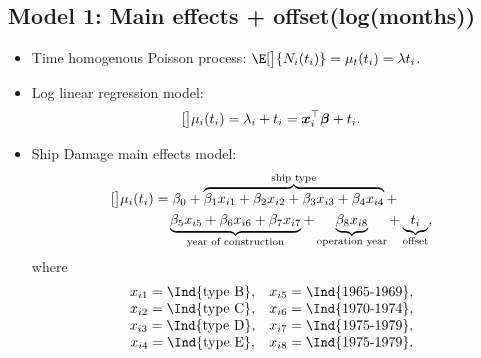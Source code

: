 \documentclass{article}\usepackage[]{graphicx}\usepackage[svgnames]{xcolor}
\let\log\relax%
\providecommand{\Vector}[1]{\bm{#1}}%
\begin{document}
\subsection*{Model 1: Main effects + offset(log(months))}
\begin{itemize}
    \item Time homogenous Poisson process: $ \E[\big]{N_i(t_i)}=\mu_t(t_i)=\lambda t_i $.
    \item Log linear regression model:
          \[ \log[\big]{\mu_i(t_i)}=\log{\lambda_i}+\log{t_i}=\Vector{x}_i^\top \Vector{\beta}+\log{t_i}. \]
    \item Ship Damage main effects model:
          \begin{align*}
              \log[\big]{\mu_i(t_i)}
               & =\beta_0+\overbrace{\beta_1x_{i1}+\beta_2x_{i2}+\beta_3x_{i3}+\beta_4x_{i4}}^{\text{ship type}}+ \\
               & \quad \underbrace{\beta_5x_{i5}+\beta_6x_{i6}+\beta_7x_{i7}}_{\text{year of construction}}+
              \underbrace{\beta_8x_{i8}}_{\text{operation year}}+\underbrace{\log{t_i}}_{\text{offset}},
          \end{align*}
          where
          \[ \begin{array}{cc}
                  x_{i1}=\Ind{\text{type B}}, & x_{i5}=\Ind{\text{1965-1969}}, \\
                  x_{i2}=\Ind{\text{type C}}, & x_{i6}=\Ind{\text{1970-1974}}, \\
                  x_{i3}=\Ind{\text{type D}}, & x_{i7}=\Ind{\text{1975-1979}}, \\
                  x_{i4}=\Ind{\text{type E}}, & x_{i8}=\Ind{\text{1975-1979}}. \\
              \end{array} \]
\end{itemize}
\end{document}
